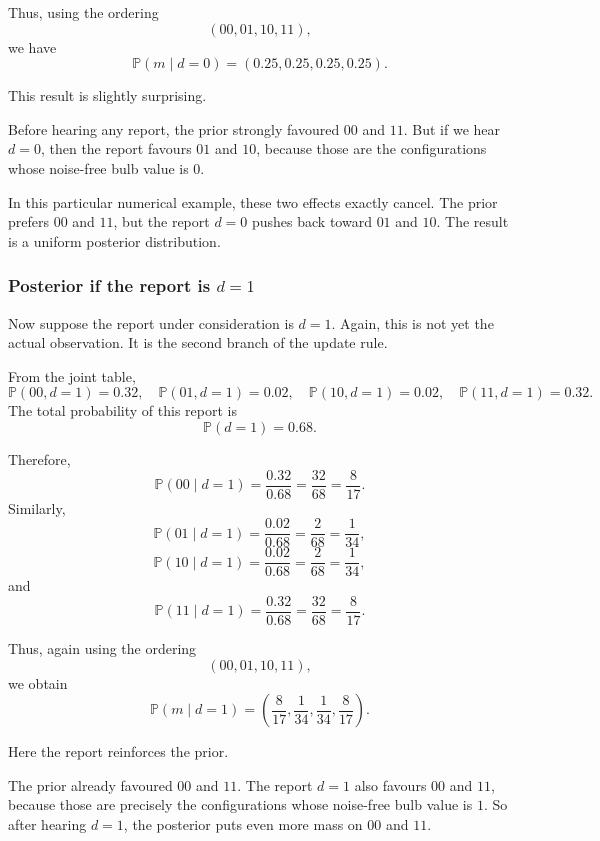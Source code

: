 \documentclass[11pt]{article}
\begin{document}
Thus, using the ordering
\[
    (00,01,10,11),
\]
we have
\[
    \mathbb{P}(m\mid d=0)
    =
    (0.25,0.25,0.25,0.25).
\]

This result is slightly surprising.

Before hearing any report, the prior strongly favoured \(00\) and \(11\). But if we hear \(d=0\), then the report favours \(01\) and \(10\), because those are the configurations whose noise-free bulb value is \(0\).

In this particular numerical example, these two effects exactly cancel. The prior prefers \(00\) and \(11\), but the report \(d=0\) pushes back toward \(01\) and \(10\). The result is a uniform posterior distribution.

\subsubsection{Posterior if the report is \(d=1\)}

Now suppose the report under consideration is \(d=1\). Again, this is not yet the actual observation. It is the second branch of the update rule.

From the joint table,
\[
    \mathbb{P}(00,d=1)=0.32,
    \quad
    \mathbb{P}(01,d=1)=0.02,
    \quad
    \mathbb{P}(10,d=1)=0.02,
    \quad
    \mathbb{P}(11,d=1)=0.32.
\]
The total probability of this report is
\[
    \mathbb{P}(d=1)=0.68.
\]

Therefore,
\[
    \mathbb{P}(00\mid d=1)
    =
    \frac{0.32}{0.68}
    =
    \frac{32}{68}
    =
    \frac{8}{17}.
\]
Similarly,
\[
    \mathbb{P}(01\mid d=1)
    =
    \frac{0.02}{0.68}
    =
    \frac{2}{68}
    =
    \frac{1}{34},
\]
\[
    \mathbb{P}(10\mid d=1)
    =
    \frac{0.02}{0.68}
    =
    \frac{2}{68}
    =
    \frac{1}{34},
\]
and
\[
    \mathbb{P}(11\mid d=1)
    =
    \frac{0.32}{0.68}
    =
    \frac{32}{68}
    =
    \frac{8}{17}.
\]

Thus, again using the ordering
\[
    (00,01,10,11),
\]
we obtain
\[
    \mathbb{P}(m\mid d=1)
    =
    \left(
        \frac{8}{17},
        \frac{1}{34},
        \frac{1}{34},
        \frac{8}{17}
    \right).
\]

Here the report reinforces the prior.

The prior already favoured \(00\) and \(11\). The report \(d=1\) also favours \(00\) and \(11\), because those are precisely the configurations whose noise-free bulb value is \(1\). So after hearing \(d=1\), the posterior puts even more mass on \(00\) and \(11\).
\end{document}

